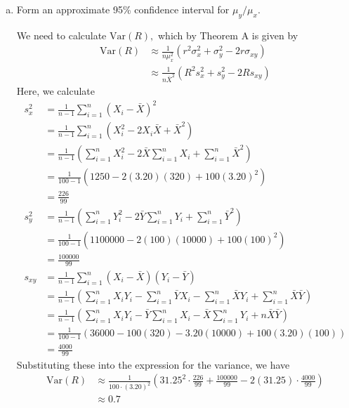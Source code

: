 \documentclass{article}
\newcommand{\var}{\mathrm{Var}}
\begin{document}
\begin{itemize}
\begin{enumerate}[a.]
			\item Form an approximate 95\% confidence interval for $\mu_y/\mu_x.$ 
				\begin{soln}
					We need to calculate $\var(R),$ which by Theorem A is given by
					\begin{align*}
						\var(R) &\approx \frac{1}{n\mu_x^2}(r^2\sigma_x^2 + \sigma_y^2-2r\sigma_{xy}) \\
						&\approx \frac{1}{n\bar{X}^2}(R^2s_x^2 + s_y^2-2Rs_{xy})
					\end{align*}
					Here, we calculate
					\begin{align*}
						s_x^2 &= \frac{1}{n-1}\sum_{i=1}^{n} (X_i-\bar{X})^2 \\
						&= \frac{1}{n-1} \sum_{i=1}^{n} (X_i^2-2X_i\bar{X}+\bar{X}^2) \\
						&= \frac{1}{n-1}\left( \sum_{i=1}^{n} X_i^2 - 2\bar{X}\sum_{i=1}^{n} X_i + \sum_{i=1}^{n} \bar{X}^2 \right) \\
						&= \frac{1}{100-1}\left( 1250 - 2(3.20)(320) + 100(3.20)^2 \right) \\
						&= \frac{226}{99} \\
						s_y^2 &= \frac{1}{n-1} \left( \sum_{i=1}^{n} Y_i^2 - 2\bar{Y}\sum_{i=1}^{n} Y_i + \sum_{i=1}^{n} \bar{Y}^2 \right) \\
						&= \frac{1}{100-1} \left( 1100000-2(100)(10000)+100(100)^2 \right) \\
						&= \frac{100000}{99} \\
						s_{xy} &= \frac{1}{n-1} \sum_{i=1}^{n}(X_i-\bar{X})(Y_i-\bar{Y}) \\
						&= \frac{1}{n-1} \left( \sum_{i=1}^{n}X_iY_i-\sum_{i=1}^{n}\bar{Y}X_i - \sum_{i=1}^{n} \bar{X}Y_i + \sum_{i=1}^{n} \bar{X}\bar{Y}\right) \\
						&= \frac{1}{n-1} \left( \sum_{i=1}^{n}X_iY_i - \bar{Y}\sum_{i=1}^{n}X_i - \bar{X}\sum_{i=1}^{n} Y_i  + n\bar{X}\bar{Y}\right) \\
						&= \frac{1}{100-1}\left( 36000-100(320)-3.20(10000)+100(	3.20)(100) \right) \\
						&= \frac{4000}{99}
					\end{align*}
					Substituting these into the expression for the variance, we have
					\begin{align*}
						\var(R) &\approx \frac{1}{100\cdot(3.20)^2}\left(31.25^2\cdot \frac{226}{99} + \frac{100000}{99} - 2(31.25)\cdot\frac{4000}{99}\right) \\
						&\approx0.7
					\end{align*}


\end{soln}
\end{enumerate}
\end{itemize}
\end{document}
